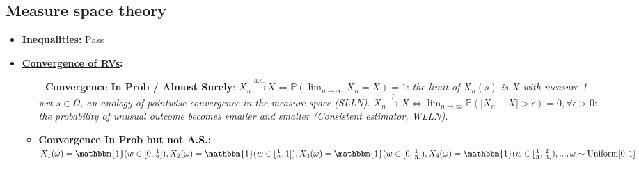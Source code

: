 \documentclass[9pt, landscape]{article}
\begin{document}
\begin{multicols*}{3}
\subsection{Measure space theory}
\begin{itemize}
	\item \textbf{Inequalities:} Pass
	\item \textbf{\href{https://en.wikipedia.org/wiki/Convergence_of_random_variables}{Convergence of RVs}:}
	\begin{itemize}[leftmargin=10pt,noitemsep,topsep=0pt,partopsep=0pt]
	\item[-] \textbf{Convergence In Prob / Almost Surely}: $X_n \xrightarrow{a.s.} X \iff \mathbb{P}\left( \lim_{n\rightarrow\infty}X_n = X \right) = 1$: \emph{the limit of $X_n(s)$ is $X$ with measure 1 wrt $s\in \Omega$, an anology of pointwise convergence in the measure space (SLLN).} $X_n \xrightarrow{p} X \iff \lim_{n\rightarrow\infty}\mathbb{P}\left(|X_n - X| > \epsilon \right) = 0, \forall \epsilon >0$: \textit{the probability of unusual outcome becomes smaller and smaller (Consistent estimator, WLLN).}
	\item \textbf{Convergence In Prob but not A.S.:} $X_1(\omega) = \mathbbm{1}(w\in[0, \tfrac{1}{2}]), X_2(\omega) = \mathbbm{1}(w\in[\tfrac{1}{2}, 1]), X_3(\omega) = \mathbbm{1}(w\in[0, \tfrac{1}{3}]), X_4(\omega) = \mathbbm{1}(w\in[\tfrac{1}{3}, \tfrac{2}{3}]), ..., \omega \sim \text{Uniform}[0, 1]$.
	\end{itemize}
\end{itemize}

\end{multicols*}
\end{document}
